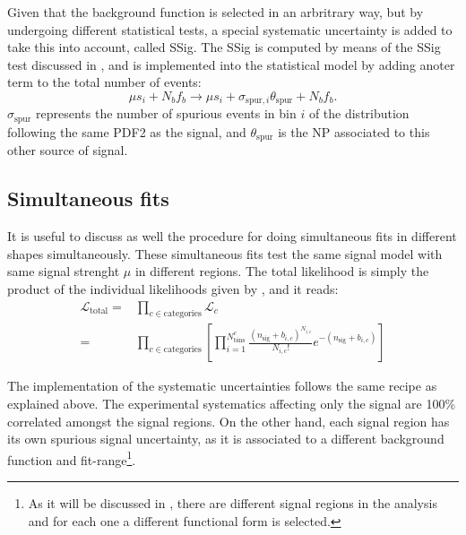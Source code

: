 Given that the background function is selected in an arbritrary way, but by undergoing different statistical tests, a special systematic uncertainty is added to take this into account, called \acf{SSig}. The \ac{SSig} is computed by means of the \ac{SSig} test discussed in \Sect{\ref{subsubsec:bkg:modeling:sigbkg:sstest}}, and is implemented into the statistical model by adding anoter term to the total number of events:
\begin{equation}
    \mu s_i + N_b f_b \to \mu s_i + \sigma_{\text{spur}, i} \theta_{\text{spur}} + N_b f_b.
\end{equation}
\(\sigma_{\text{spur}}\) represents the number of spurious events in bin \(i\) of the distribution following the same \ac{PDF2} as the signal, and \(\theta_{\text{spur}}\) is the \ac{NP} associated to this other source of signal.

\subsection{Simultaneous fits}
\label{subsec:strategy:stat_treatment:simult_fits}

It is useful to discuss as well the procedure for doing simultaneous fits in different \myj shapes simultaneously. These simultaneous fits test the same signal model with same signal strenght \(\mu\) in different regions. The total likelihood is simply the product of the individual likelihoods given by \Eqn{\ref{eq:strategy:stat_treatment:stat_model:likelihood}}, and it reads:
\begin{align}
    \mathcal{L}_{\text{total}} =& \prod_{c\in \text{categories}} \mathcal{L}_c\\
    =& \prod_{c\in \text{categories}} \left[
        \prod_{i=1}^{N^c_{\text{bins}}} \frac{\left( n_{\text{sig}} + b_{i, c} \right)^{N_{i, c}}}{N_{i, c} !} e^{-\left( n_{\text{sig}} + b_{i, c} \right)}
    \right]
\end{align}
    
The implementation of the systematic uncertainties follows the same recipe as explained above. The experimental systematics affecting only the signal are 100\% correlated amongst the signal regions. On the other hand, each signal region has its own spurious signal uncertainty, as it is associated to a different background function and fit-range\footnote{As it will be discussed in \Ch{\ref{ch:bkg}}, there are different signal regions in the analysis and for each one a different functional form is selected.}.








